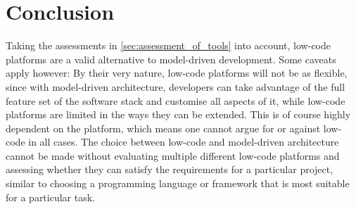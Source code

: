 \documentclass[runningheads]{llncs}
\begin{document}
\section{Conclusion}
\label{sec:conclusion}

Taking the assessments in \cref{sec:assessment_of_tools} into account, low-code platforms are a valid alternative to model-driven development. Some caveats apply however: By their very nature, low-code platforms will not be as flexible, since with model-driven architecture, developers can take advantage of the full feature set of the software stack and customise all aspects of it, while low-code platforms are limited in the ways they can be extended. This is of course highly dependent on the platform, which means one cannot argue for or against low-code in all cases. The choice between low-code and model-driven architecture cannot be made without evaluating multiple different low-code platforms and assessing whether they can satisfy the requirements for a particular project, similar to choosing a programming language or framework that is most suitable for a particular task.

\newpage
\printbibliography
\end{document}
